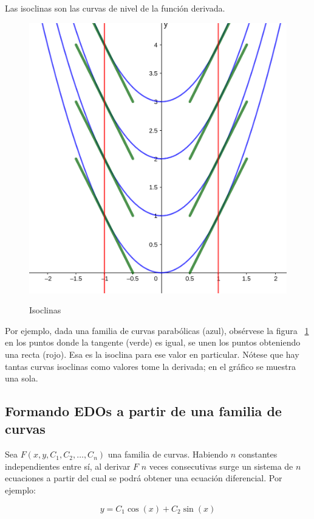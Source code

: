 \documentclass{article}
\begin{document}
Las isoclinas son las curvas de nivel de la función derivada.

\begin{figure}[ht]
\caption{Isoclinas}
\includegraphics[scale=1]{../img/ode/isoclines.png} 
\centering
\label{fig:isoclinas}
\end{figure}

Por ejemplo, dada una familia de curvas parabólicas (azul), obsérvese la figura ~\ref{fig:isoclinas} en los puntos donde la tangente (verde) es igual, se unen los puntos obteniendo una recta (rojo). Esa es la isoclina para ese valor en particular. Nótese que hay tantas curvas isoclinas como valores tome la derivada; en el gráfico se muestra una sola.

\subsection{Formando EDOs a partir de una familia de curvas}

Sea $F(x, y, C_1, C_2, \ldots, C_n)$ una familia de curvas. Habiendo $n$ constantes independientes entre sí, al derivar $F$ $n$ veces consecutivas surge un sistema de $n$ ecuaciones a partir del cual se podrá obtener una ecuación diferencial. Por ejemplo:

\begin{equation}
y = C_1 \cos(x) + C_2 \sin(x)
\end{equation}
\end{document}
